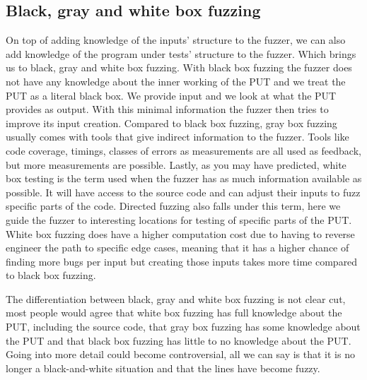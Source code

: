 \subsection{Black, gray and white box fuzzing}
\label{fuzzing:BlackGrayWhiteFuzzing}
On top of adding knowledge of the inputs' structure to the fuzzer, we can also add knowledge of the program under tests' structure to the fuzzer. Which brings us to black, gray and white box fuzzing. With black box fuzzing the fuzzer does not have any knowledge about the inner working of the PUT and we treat the PUT as a literal black box. We provide input and we look at what the PUT provides as output. With this minimal information the fuzzer then tries to improve its input creation. 
Compared to black box fuzzing, gray box fuzzing usually comes with tools that give indirect information to the fuzzer. Tools like code coverage, timings, classes of errors as measurements are all used as feedback, but more measurements are possible. 
Lastly, as you may have predicted, white box testing is the term used when the fuzzer has as much information available as possible. It will have access to the source code and can adjust their inputs to fuzz specific parts of the code. Directed fuzzing also falls under this term, here we guide the fuzzer to interesting locations for testing of specific parts of the PUT. White box fuzzing does have a higher computation cost due to having to reverse engineer the path to specific edge cases, meaning that it has a higher chance of finding more bugs per input but creating those inputs takes more time compared to black box fuzzing. 

The differentiation between black, gray and white box fuzzing is not clear cut, most people would agree that white box fuzzing has full knowledge about the PUT, including the source code, that gray box fuzzing has some knowledge about the PUT and that black box fuzzing has little to no knowledge about the PUT. Going into more detail could become controversial, all we can say is that it is no longer a black-and-white situation and that the lines have become fuzzy.

